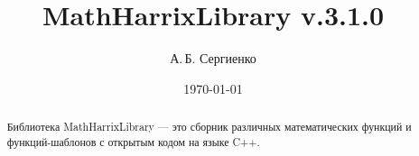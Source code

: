 \documentclass[a4paper,12pt]{article}
\title{MathHarrixLibrary v.3.1.0}
\author{А.\,Б. Сергиенко}
\date{\today}
\begin{document}


\maketitle

\begin{abstract}
Библиотека MathHarrixLibrary --- это сборник различных математических функций и функций-шаблонов с открытым кодом на языке C++.
\end{abstract}

\tableofcontents
\end{document}
